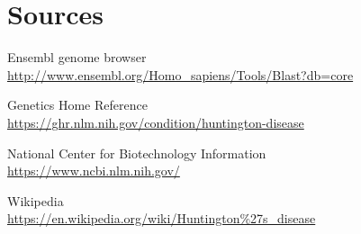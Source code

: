 \section{Sources}

\begin{description}

\large\item Ensembl genome browser\\
\small\url{http://www.ensembl.org/Homo_sapiens/Tools/Blast?db=core}

\medskip

\large\item Genetics Home Reference\\
\small\url{https://ghr.nlm.nih.gov/condition/huntington-disease}

\medskip

\large\item National Center for Biotechnology Information\\
\small\url{https://www.ncbi.nlm.nih.gov/}

\medskip

\large\item Wikipedia\\
\small\url{https://en.wikipedia.org/wiki/Huntington\%27s_disease}

\end{description}


\newpage
